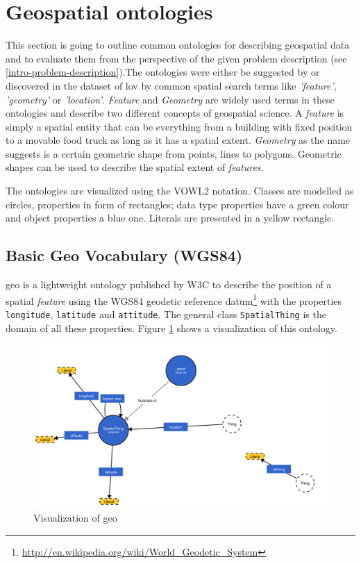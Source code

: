 \documentclass[draft,final]{vutinfth} %
\begin{document}
\section{Geospatial ontologies}
\label{related-work-geospatial-ontologies}
This section is going to outline common ontologies for describing geospatial data and to evaluate them from the perspective of the given problem description (see \ref{intro-problem-description}).The ontologies were either be suggested by \cite{tandy_spatial_2016} or discovered in the dataset of \gls{lov} by common spatial search terms like \textit{'feature'}, \textit{'geometry'} or \textit{'location'}. \textit{Feature} and \textit{Geometry} are widely used terms in these ontologies and describe two different concepts of geospatial science. A \textit{feature}  is simply a spatial entity that can be everything from a building with fixed position to a movable food truck as long as it has a spatial extent. \textit{Geometry} as the name suggests is a certain geometric shape from points, lines to polygons. Geometric shapes can be used to describe  the spatial extent of \textit{features}.

The ontologies are visualized using the VOWL2 notation\cite{lohmann_vowl_2014}. Classes are modelled as circles, properties in form of rectangles; data type properties have a green colour and object properties a blue one. Literals are presented in a yellow rectangle.

\subsection{Basic Geo Vocabulary (WGS84)}
\label{related-work-geospatial-ontologies-wgs84}

\gls{geo}\cite{brickley_basic_2003} is a lightweight ontology published by W3C to describe the position of a spatial \textit{feature} using the WGS84 geodetic reference datum\footnote{\url{http://en.wikipedia.org/wiki/World_Geodetic_System}} with the properties \texttt{longitude}, \texttt{latitude} and \texttt{attitude}. The general class \texttt{SpatialThing} is the domain of all these properties. Figure \ref{fig:related-work-geospatial-ontologies:wgs84} shows a visualization of this ontology.

\begin{figure}[H]
    \centering    
    \includegraphics[width=\columnwidth]{graphics/vocabularies/wgs84.png}
    \caption{Visualization of \gls{geo}}
    \label{fig:related-work-geospatial-ontologies:wgs84}
\end{figure}
\end{document}
